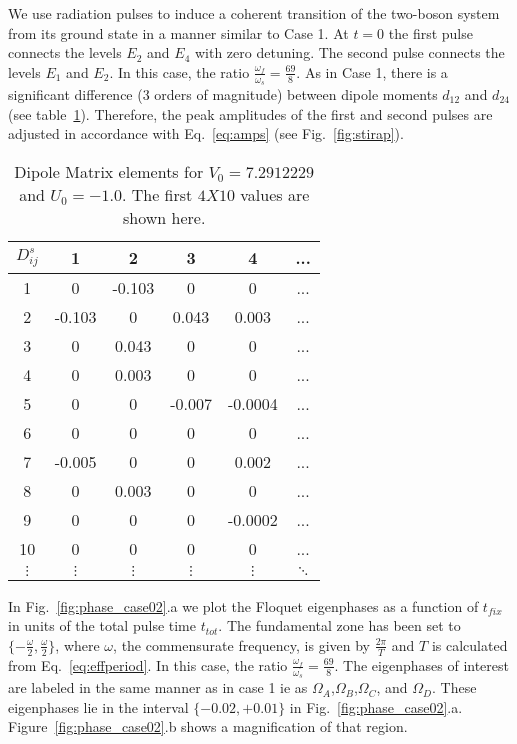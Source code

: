 We use radiation pulses to  induce a coherent transition of the two-boson system from its ground state in a manner similar to Case 1.  At $t=0$ the first pulse connects the levels $E_2$ and $E_4$ with zero detuning. The second pulse connects the  levels $E_1$ and $E_2$.  In this case, the ratio $\frac{\omega_f}{\omega_s}=\frac{69}{8}$. As in Case 1, there is a significant difference ($3$ orders of magnitude) between dipole moments $d_{12}$ and $d_{24}$ (see table~\ref{tabB}). Therefore, the peak amplitudes of the first and second pulses are adjusted in accordance with Eq.~\eqref{eq:amps} (see Fig.~\ref{fig:stirap}).
%
%
\begin{table}
\begin{center}
\begin{tabular}{|c|ccccc}
$D^s_{ij}$ & 1& 2& 3& 4& ...\\
\hline
1& 0&-0.103& 0& 0& ...\\
2&-0.103 & 0&0.043 &0.003 &  ...\\
3& 0&0.043 & 0& 0&... \\
4& 0&0.003 & 0& 0&   ... \\
5& 0& 0&-0.007 &-0.0004 &   ... \\
6& 0& 0& 0& 0&   ... \\
7&-0.005 & 0& 0&0.002 &  ... \\
8& 0&0.003 & 0& 0&   ...\\
9& 0& 0& 0&-0.0002 & ... \\
10& 0& 0& 0& 0&   ... \\
$\vdots$& $\vdots$& $\vdots$& $\vdots$& $\vdots$& $\ddots$\\
\end{tabular}
\caption{Dipole Matrix elements for $V_0=7.2912229$ and $U_0=-1.0$. The first $4 X 10$ values are shown here. }
\label{tabB}
\end{center}
\end{table}
%
%
In Fig.~\ref{fig:phase_case02}.a we plot the Floquet eigenphases as a function of $t_{fix}$  in units of the total pulse time $t_{tot}$. The fundamental zone  has been set to $\lbrace - \frac{\omega}{2},\frac{\omega}{2}\rbrace $, where $\omega$, the commensurate frequency, is given by $\frac{2\pi}{T}$ and $T$ is calculated from Eq.~\eqref{eq:effperiod}.  In this case, the ratio $\frac{\omega_f}{\omega_s}=\frac{69}{8}$. The eigenphases of interest are  labeled in the same manner as in case 1 ie as $\Omega_A$,$\Omega_B$,$\Omega_C$, and $\Omega_D$. These eigenphases lie in the interval $\lbrace -0.02, +0.01 \rbrace$ in Fig.~\ref{fig:phase_case02}.a.  Figure~\ref{fig:phase_case02}.b  shows a magnification of that region. 

